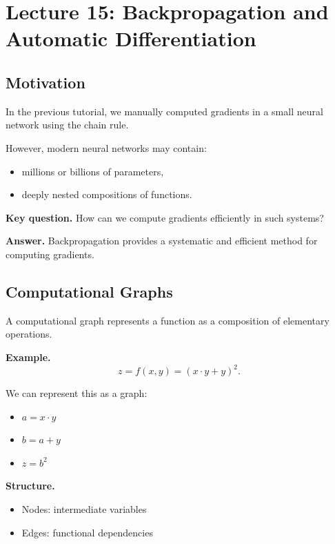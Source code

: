 \section{Lecture 15: Backpropagation and Automatic Differentiation}

\subsection{Motivation}

In the previous tutorial, we manually computed gradients in a small neural network using the chain rule.

\medskip

\noindent
However, modern neural networks may contain:
\begin{itemize}
    \item millions or billions of parameters,
    \item deeply nested compositions of functions.
\end{itemize}

\medskip

\noindent
\textbf{Key question.}  
How can we compute gradients efficiently in such systems?

\medskip

\noindent
\textbf{Answer.}  
Backpropagation provides a systematic and efficient method for computing gradients.

\subsection{Computational Graphs}

A computational graph represents a function as a composition of elementary operations.

\medskip

\noindent
\textbf{Example.}
\[
z = f(x,y) = (x \cdot y + y)^2.
\]

\medskip

\noindent
We can represent this as a graph:
\begin{itemize}
    \item $a = x \cdot y$
    \item $b = a + y$
    \item $z = b^2$
\end{itemize}

\medskip

\noindent
\textbf{Structure.}
\begin{itemize}
    \item Nodes: intermediate variables
    \item Edges: functional dependencies
\end{itemize}

